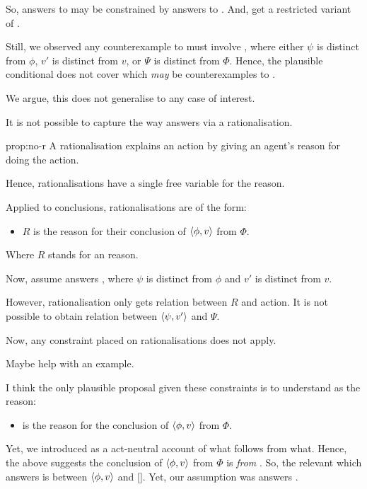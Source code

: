 \begin{note}
  So, answers to \qWhyR{} may be constrained by answers to \qHowR{}.
  And, get a restricted variant of \issueInclusion{}.

  Still, we observed any counterexample to \issueInclusion{} must involve , where either \(\psi\) is distinct from \(\phi\), \(v'\) is distinct from \(v\), or \(\Psi\) is distinct from \(\Phi\).
  Hence, the plausible conditional does not cover  which \emph{may} be counterexamples to \issueInclusion{}.

  We argue, this does not generalise to any case of interest.

  \begin{proposition}
    \label{prop:no-r}
    It is not possible to capture the way  answers \qWhy{} via a rationalisation.
  \end{proposition}

  \begin{argument}{prop:no-r}
    A rationalisation explains an action by giving an agent's reason for doing the action.

    Hence, rationalisations have a single free variable for the \agents{} reason.

    Applied to conclusions, rationalisations are of the form:
    \begin{itemize}
    \item
      \(R\) is the \agents{} reason for their conclusion of \(\langle\phi, v\rangle\) from \(\Phi\).
    \end{itemize}
    Where \(R\) stands for an \agents{} reason.

    Now, assume  answers \qWhy{}, where \(\psi\) is distinct from \(\phi\) and \(v'\) is distinct from \(v\).

    However, rationalisation only gets relation between \(R\) and action.
    It is not possible to obtain relation between \(\langle\psi, v'\rangle\) and \(\Psi\).

    Now, any constraint placed on rationalisations does not apply.
  \end{argument}

  Maybe help with an example.

  I think the only plausible proposal given these constraints is to understand  as the \agents{} reason:
  \begin{itemize}
  \item
     is the \agents{} reason for the conclusion of \(\langle\phi, v\rangle\) from \(\Phi\).
  \end{itemize}
  Yet, we introduced \fingfr{} as a act-neutral account of what follows from what.
  Hence, the above suggests the conclusion of \(\langle\phi, v\rangle\) from \(\Phi\) is \emph{from} .
  So, the relevant \fingfr{} which answers \qWhy{} is between \(\langle\phi, v\rangle\) and [].
  Yet, our assumption was  answers \qWhy{}.
\end{note}


